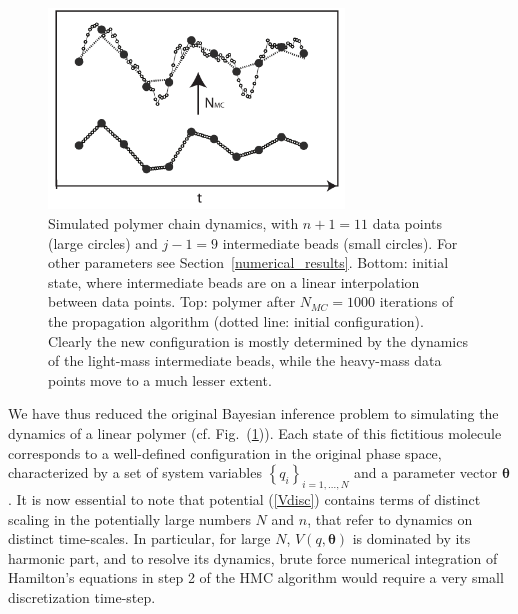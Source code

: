 \documentclass[11pt]{article}
\theoremstyle{definition}
\newcommand{\bt}{\pmb\theta}
\begin{document}

\begin{figure}[htb!]
    \centering
    \includegraphics[width=0.7\textwidth]{FigPolymer2.pdf}
    \caption{Simulated polymer chain dynamics, with $n+1=11$ data points (large circles) and $j-1=9$ intermediate beads (small circles). For other parameters see Section~\ref{numerical_results}. Bottom: initial state, where intermediate beads are on a linear interpolation between data points. Top: polymer after $N_{MC}=1000$ iterations of the propagation algorithm (dotted line: initial configuration). Clearly the new configuration is mostly determined by the dynamics of the light-mass intermediate beads, while the heavy-mass data points move to a much lesser extent.}
    \label{fig:polymer}
\end{figure}

We have thus reduced the original Bayesian inference problem to simulating the dynamics of a linear polymer (cf. Fig.~(\ref{fig:polymer})). Each state of this fictitious molecule corresponds to a well-defined configuration in the original phase space, characterized by a set of system variables $\left\{q_i\right\}_{i=1,\dots,N}$ and a parameter vector $\bt$. It is now essential to note that potential (\ref{Vdisc}) contains terms of distinct scaling in the potentially large numbers $N$ and $n$, that refer to dynamics on distinct time-scales. In particular, for large $N$, $V(q,\bt)$ is dominated by its harmonic part, and to resolve its dynamics, brute force numerical integration of Hamilton's equations in step 2 of the HMC algorithm would require a very small discretization time-step.
\end{document}
